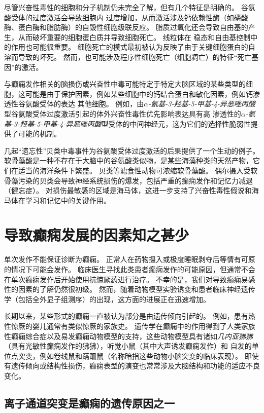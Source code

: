 尽管兴奋性毒性的细胞和分子机制仍未完全了解，但有几个特征是明确的。
谷氨酸受体的过度激活会导致细胞内  过度增加，从而激活涉及钙依赖性酶（如磷酸酶、蛋白酶和脂肪酶）的自毁性细胞级联反应。
脂质过氧化还会导致自由基的产生，从而破坏重要的细胞蛋白质并导致细胞死亡。
线粒体在  稳态和自由基控制中的作用也可能很重要。 细胞死亡的模式最初被认为反映了由于关键细胞蛋白的自溶而导致的坏死。
然而，也可能涉及程序性细胞死亡（细胞凋亡）的特征“死亡基因”的激活。


与癫痫发作相关的脑损伤或兴奋性中毒可能特定于特定大脑区域的某些类型的细胞，这可能是由于保护因素，例如某些细胞中的钙结合蛋白和敏化因素，例如钙渗透性谷氨酸受体的表达 其他细胞。
例如，由\textit{$\alpha$-氨基-3-羟基-5-甲基-4-异恶唑丙酸}型谷氨酸受体过度激活引起的体外兴奋性毒性优先影响表达具有高  渗透性的\textit{$\alpha$-氨基-3-羟基-5-甲基-4-异恶唑丙酸}型受体的中间神经元，这为它们的选择性脆弱性提供了可能的机制。


几起“遗忘性”贝类中毒事件为谷氨酸受体过度激活的后果提供了一个生动的例子。
软骨藻酸是一种不存在于大脑中的谷氨酸类似物，是某些海藻种类的天然产物，它们在适当的海洋条件下繁盛。
贝类等滤食性动物可浓缩软骨藻酸。
偶尔摄入受软骨藻污染的贝类会导致神经系统损伤的爆发，包括严重的癫痫发作和记忆力减退（健忘症）。
对损伤最敏感的区域是海马体，这进一步支持了兴奋性毒性假说和海马体在学习和记忆中的关键作用。



\section{导致癫痫发展的因素知之甚少}

单次发作不能保证诊断为癫痫。
正常人在药物摄入或极度睡眠剥夺后等情有可原的情况下可能会发作。
临床医生寻找此类患者癫痫发作的可能原因，但通常不会在单次癫痫发作后开始使用抗惊厥药进行治疗。
不幸的是，我们对导致癫痫易感性的因素的了解仍然很初级。
然而，随着动物模型实验诱变和患者临床神经遗传学（包括全外显子组测序）的出现，这方面的进展正在迅速增加。


长期以来，某些形式的癫痫一直被认为部分是由遗传倾向引起的。
例如，患有热性惊厥的婴儿通常有类似惊厥的家族史。
遗传学在癫痫中的作用得到了人类家族性癫痫综合症以及易发癫痫动物模型的支持，这些动物模型具有诸如\textit{几内亚狒狒}（具有光敏性癫痫发作的狒狒），听觉小鼠（其中大声诱发癫痫发作）和 自发的单位点突变，例如卷线鼠和蹒跚鼠（名称暗指这些动物小脑突变的临床表现）。
即使有遗传倾向或结构性损伤，癫痫表型的演变也常常涉及大脑结构和功能的适应不良变化。



\subsection{离子通道突变是癫痫的遗传原因之一}

